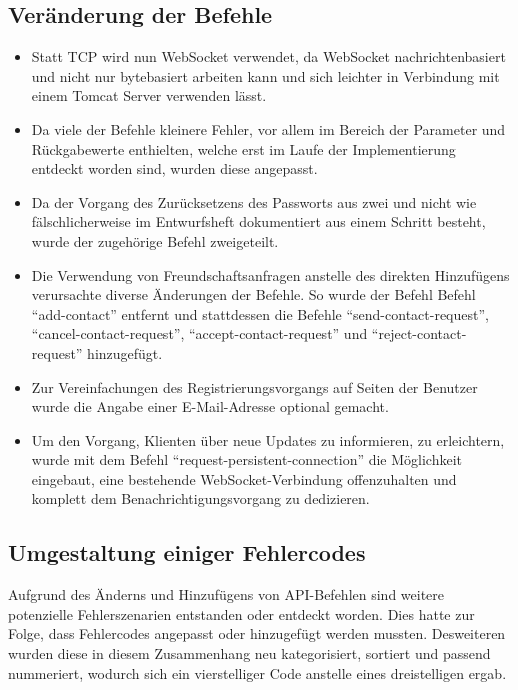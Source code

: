 \documentclass[parskip=full,11pt]{scrartcl}
\begin{document}
\subsection{Veränderung der Befehle}
	\begin{itemize}
		\item Statt TCP wird nun WebSocket verwendet, da WebSocket
			nachrichtenbasiert und nicht nur bytebasiert arbeiten kann und sich
			leichter in Verbindung mit einem Tomcat Server verwenden lässt.
		\item Da viele der Befehle kleinere Fehler, vor allem im Bereich der
			Parameter und Rückgabewerte enthielten, welche erst im Laufe der
			Implementierung entdeckt worden sind, wurden diese angepasst.
		\item Da der Vorgang des Zurücksetzens des Passworts aus zwei und nicht
			wie fälschlicherweise im Entwurfsheft dokumentiert aus einem
			Schritt besteht, wurde der zugehörige Befehl zweigeteilt.
		\item Die Verwendung von Freundschaftsanfragen anstelle des direkten
			Hinzufügens verursachte diverse Änderungen der Befehle.
			So wurde der Befehl Befehl \enquote{add-contact} entfernt und
			stattdessen die Befehle \enquote{send-contact-request},
			\enquote{cancel-contact-request}, \enquote{accept-contact-request}
			und \enquote{reject-contact-request} hinzugefügt.
		\item Zur Vereinfachungen des Registrierungsvorgangs auf Seiten der
			Benutzer wurde die Angabe einer E-Mail-Adresse optional gemacht.
		\item Um den Vorgang, Klienten über neue Updates zu informieren, zu
			erleichtern, wurde mit dem Befehl
			\enquote{request-persistent-connection} die Möglichkeit eingebaut,
			eine bestehende WebSocket-Verbindung offenzuhalten und komplett dem
			Benachrichtigungsvorgang zu dedizieren.
	\end{itemize}

\subsection{Umgestaltung einiger Fehlercodes}
	Aufgrund des Änderns und Hinzufügens von API-Befehlen
	sind weitere potenzielle Fehlerszenarien entstanden oder entdeckt worden.
	Dies hatte zur Folge, dass Fehlercodes angepasst oder hinzugefügt werden
	mussten.
	Desweiteren wurden diese in diesem Zusammenhang neu kategorisiert,
	sortiert und passend nummeriert, wodurch sich ein vierstelliger Code
	anstelle eines dreistelligen ergab.
\end{document}
